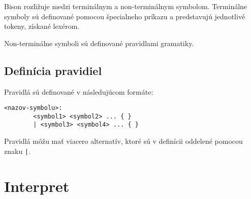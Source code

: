 Bison rozližuje medzi terminálnym a non-terminálnym symbolom. Terminálne symboly sú definované pomocou špecialneho príkazu a predstavujú
jednotlivé tokeny, získané lexérom.

Non-terminálne symboli sú definované pravidlami gramatiky. 
\subsection{Definícia pravidiel}
Pravidlá sú definované v následujúcom formáte:

\begin{verbatim}
<nazov-symbolu>:
        <symbol1> <symbol2> ... { } 
        | <symbol3> <symbol4> ... { }
\end{verbatim}

Pravidlá môžu mať viacero alternatív, ktoré sú v definícii oddelené pomocou znaku \texttt{|}. 



\section{Interpret}

	
